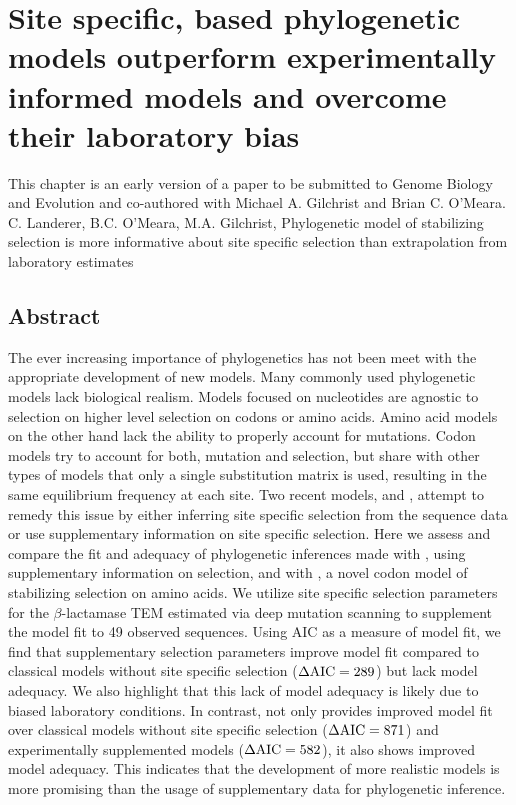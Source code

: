 
\chapter{Site specific, \PC based phylogenetic models outperform experimentally informed models and overcome their laboratory bias} 
\label{ch:phylogeny}

\clearpage
\pagebreak

This chapter is an early version of a paper to be submitted to Genome Biology and Evolution and co-authored with Michael A. Gilchrist and Brian C. O'Meara.\\
\newline
\newline
C. Landerer, B.C. O'Meara, M.A. Gilchrist, Phylogenetic model of stabilizing selection is more informative about site specific selection than extrapolation from laboratory estimates

\section{Abstract}
The ever increasing importance of phylogenetics has not been meet with the appropriate development of new models.
Many commonly used phylogenetic models lack biological realism.
Models focused on nucleotides are agnostic to selection on higher level selection on codons or amino acids.
Amino acid models on the other hand lack the ability to properly account for mutations.
Codon models try to account for both, mutation and selection, but share with other types of models that only a single substitution matrix is used, resulting in the same equilibrium frequency at each site.
Two recent models, \selac and \phydms, attempt to remedy this issue by either inferring site specific selection from the sequence data or use supplementary information on site specific selection.
Here we assess and compare the fit and adequacy of phylogenetic inferences made  with \phydms, using supplementary information on selection, and with \selac, a novel codon model of stabilizing selection on amino acids.
We utilize site specific selection parameters for the $\beta$-lactamase TEM estimated via deep mutation scanning to supplement the \phydms model fit to 49 observed sequences.
Using AIC as a measure of model fit, we find that supplementary selection parameters improve model fit compared to classical models without site specific selection ($\Delta\text{AIC} = 289$) but lack model adequacy.
We also highlight that this lack of model adequacy is likely due to biased laboratory conditions.
In contrast, \selac not only provides improved model fit over classical models without site specific selection ($\Delta\text{AIC} = 871$) and experimentally supplemented models ($\Delta\text{AIC} = 582$), it also shows improved model adequacy.
This indicates that the development of more realistic models is more promising than the usage of supplementary data for phylogenetic inference.

